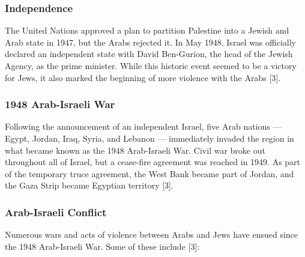 \documentclass[10pt]{article}
\begin{document}
\subsubsection{Independence}
The United Nations approved a plan to partition Palestine into a Jewish and Arab state in 1947, but the Arabs rejected it. In May 1948, Israel was officially declared an independent state with David Ben-Gurion, the head of the Jewish Agency, as the prime minister. While this historic event seemed to be a victory for Jews, it also marked the beginning of more violence with the Arabs [3]. 

\subsubsection{1948 Arab-Israeli War}
Following the announcement of an independent Israel, five Arab nations — Egypt, Jordan, Iraq, Syria, and Lebanon — immediately invaded the region in what became known as the 1948 Arab-Israeli War. Civil war broke out throughout all of Israel, but a cease-fire agreement was reached in 1949. As part of the temporary truce agreement, the West Bank became part of Jordan, and the Gaza Strip became Egyptian territory [3].

\subsubsection{Arab-Israeli Conflict}
Numerous wars and acts of violence between Arabs and Jews have ensued since the 1948 Arab-Israeli War. Some of these include [3]:
\end{document}
